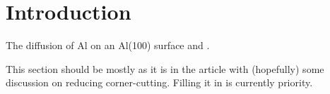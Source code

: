 \section{Introduction}
\label{sec:al-introduction}

The diffusion of Al on an Al(100) surface and .

This section should be mostly as it is in the article with (hopefully) some discussion on reducing corner-cutting.
Filling it in is currently  priority.

\placeholder
